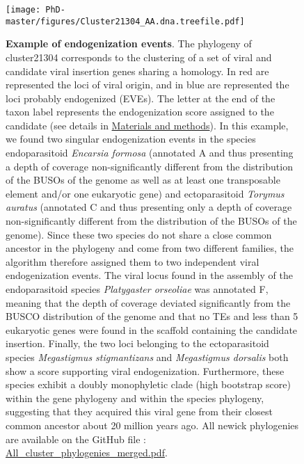 \begin{figure}[!htpb]
\captionsetup{font=footnotesize}
 \centering
  \texttt{[image: PhD-master/figures/Cluster21304\_AA.dna.treefile.pdf]}
\caption[Paper1:Canonical example of an endogeniation events]{\textbf{Example of endogenization events}. The phylogeny of cluster21304 corresponds to the clustering of a set of viral and candidate viral insertion genes sharing a homology. In red are represented the loci of viral origin, and in blue are represented the loci probably endogenized (EVEs). The letter at the end of the taxon label represents the endogenization score assigned to the candidate (see details in \hyperref[sec:MM-5]{Materials and methods}). In this example, we found two singular endogenization events in the species endoparasitoid \textit{Encarsia formosa} (annotated A and thus presenting a depth of coverage non-significantly different from the distribution of the BUSOs of the genome as well as at least one transposable element and/or one eukaryotic gene) and ectoparasitoid \textit{Torymus auratus} (annotated C and thus presenting only a depth of coverage non-significantly different from the distribution of the BUSOs of the genome). Since these two species do not share a close common ancestor in the phylogeny and come from two different families, the algorithm therefore assigned them to two independent viral endogenization events. The viral locus found in the assembly of the endoparasitoid species \textit{Platygaster orseoliae} was annotated F, meaning that the depth of coverage deviated significantly from the BUSCO distribution of the genome and that no TEs and less than 5 eukaryotic genes were found in the scaffold containing the candidate insertion. Finally, the two loci belonging to the ectoparasitoid species \textit{Megastigmus stigmantizans} and \textit{Megastigmus dorsalis} both show a score supporting viral endogenization. Furthermore, these species exhibit a doubly monophyletic clade (high bootstrap score) within the gene phylogeny and within the species phylogeny, suggesting that they acquired this viral gene from their closest common ancestor about 20 million years ago. All newick phylogenies are available on the GitHub file : \href{https://github.com/BenjaminGuinet/PhD_defense/blob/main/Supplementary_paper1/All_cluster_phylogenies_merged.pdf}{All_cluster_phylogenies_merged.pdf}.}
\label{figure:Cluster21304_phylogeny_example}
\end{figure}


